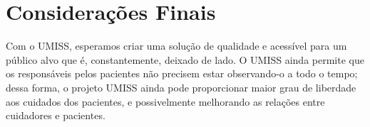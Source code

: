 \chapter{Considerações Finais}
\label{chapter:consideracoes}

Com o UMISS, esperamos criar uma solução de qualidade e acessível para um
público alvo que é, constantemente, deixado de lado. O UMISS ainda permite
que os responsáveis pelos pacientes não precisem estar observando-o a todo
o tempo; dessa forma, o projeto UMISS ainda pode proporcionar maior grau
de liberdade aos cuidados dos pacientes, e possivelmente melhorando as
relações entre cuidadores e pacientes.

